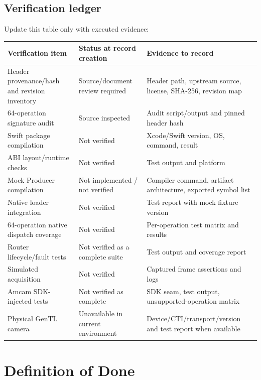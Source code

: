 \documentclass[11pt,a4paper]{report}
\begin{document}
\section{Verification ledger}
Update this table only with executed evidence:
\begin{longtable}{p{}p{}p{}}
\toprule
Verification item & Status at record creation & Evidence to record \\
\midrule
Header provenance/hash and revision inventory & Source/document review required & Header path, upstream source, license, SHA-256, revision map \\
64-operation signature audit & Source inspected & Audit script/output and pinned header hash \\
Swift package compilation & Not verified & Xcode/Swift version, OS, command, result \\
ABI layout/runtime checks & Not verified & Test output and platform \\
Mock Producer compilation & Not implemented / not verified & Compiler command, artifact architecture, exported symbol list \\
Native loader integration & Not verified & Test report with mock fixture version \\
64-operation native dispatch coverage & Not verified & Per-operation test matrix and results \\
Router lifecycle/fault tests & Not verified as a complete suite & Test output and coverage report \\
Simulated acquisition & Not verified & Captured frame assertions and logs \\
Amcam SDK-injected tests & Not verified as complete & SDK seam, test output, unsupported-operation matrix \\
Physical GenTL camera & Unavailable in current environment & Device/CTI/transport/version and test report when available \\
\bottomrule
\end{longtable}

\chapter{Definition of Done}
\end{document}
